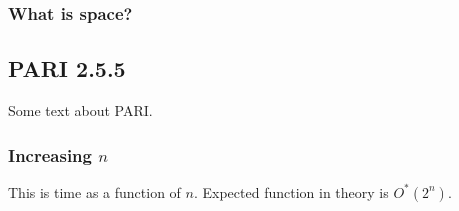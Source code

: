 \documentclass[a4paper]{article}
\newcommand{\code}{\texttt}
\begin{document}
% 

\subsubsection{What is space?}\label{whatisspace}

\subsection{PARI 2.5.5}
Some text about PARI. %

\subsubsection{Increasing $n$}

This is time as a function of $n$. Expected function in theory is $O^*(2^n)$.
\end{document}
